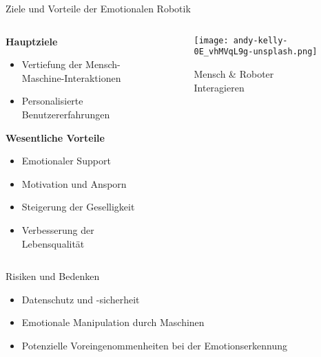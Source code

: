 \documentclass[aspectratio=169]{beamer}
\begin{document}
\begin{frame}{Ziele und Vorteile der Emotionalen Robotik}
  \begin{columns}
    \begin{column}{0.7\textwidth}
      \textbf{Hauptziele}
      \begin{itemize}
        \item Vertiefung der Mensch-Maschine-Interaktionen
        \item Personalisierte Benutzererfahrungen
      \end{itemize}

      \textbf{Wesentliche Vorteile}
      \begin{itemize}
        \item Emotionaler Support
        \item Motivation und Ansporn
        \item Steigerung der Geselligkeit
        \item Verbesserung der Lebensqualität
      \end{itemize}
    \end{column}
    \begin{column}{0.3\textwidth}
      \begin{figure}[h]
        \centering
        \texttt{[image: andy-kelly-0E\_vhMVqL9g-unsplash.png]}
        \caption{Mensch \& Roboter Interagieren}
      \end{figure}
    \end{column}
  \end{columns}
\end{frame}

\begin{frame}{Risiken und Bedenken}
  \begin{itemize}
    \item Datenschutz und -sicherheit
    \item Emotionale Manipulation durch Maschinen
    \item Potenzielle Voreingenommenheiten bei der Emotionserkennung
  \end{itemize}
\end{frame}
\end{document}
